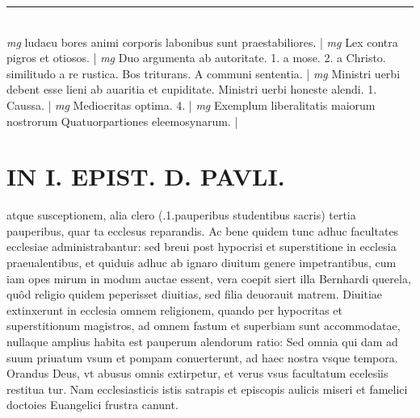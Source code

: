 \documentclass{article}
\begin{document}
\begin{pages}
\vspace{0.5cm}\noindent
\vspace{0.2cm}\rule{1cm}{0.2pt}\\ 
\hspace{0.2cm}\textit{mg}
\footnotesize ludacu bores animi corporis labonibus sunt praestabiliores. 
\normalsize| 
\hspace{0.2cm}\textit{mg}
\footnotesize Lex contra pigros et otiosos. 
\normalsize| 
\hspace{0.2cm}\textit{mg}
\footnotesize Duo argumenta ab autoritate. 1. a mose. 2. a Christo. similitudo a re rustica. Bos triturans. A communi sententia. 
\normalsize| 
\hspace{0.2cm}\textit{mg}
\footnotesize Ministri uerbi debent esse lieni ab auaritia et cupiditate. Ministri uerbi honeste alendi. 1. Caussa. 
\normalsize| 
\hspace{0.2cm}\textit{mg}
\footnotesize Mediocritas optima. 4. 
\normalsize| 
\hspace{0.2cm}\textit{mg}
\footnotesize Exemplum liberalitatis maiorum nostrorum Quatuorpartiones eleemosynarum. 
\normalsize| 
\section*{IN I. EPIST. D. PAVLI. }
\marginpar{[ p.115 ]}\pstart atque susceptionem, alia clero (.1.pauperibus studentibus sacris) tertia pauperibus, quar ta ecclesus reparandis. Ac bene quidem tunc adhuc facultates ecclesiae administrabantur: sed breui post hypocrisi et superstitione in ecclesia praeualentibus, et quiduis adhuc ab ignaro diuitum genere impetrantibus, cum iam opes mirum in modum auctae essent, vera coepit siert illa Bernhardi querela, quôd religio quidem peperisset diuitias, sed filia deuorauit matrem. Diuitiae extinxerunt in ecclesia omnem religionem, quando per hypocritas et superstitionum magistros, ad omnem fastum et superbiam sunt accommodatae, nullaque amplius habita est pauperum alendorum ratio: Sed omnia qui dam ad suum priuatum vsum et pompam conuerterunt, ad haec nostra vsque tempora. Orandus Deus, vt abusus omnis extirpetur, et verus vsus facultatum ecelesiis restitua tur. Nam ecclesiasticis istis satrapis et episcopis aulicis miseri et famelici doctoies Euangelici frustra canunt.  \pend
{}
{}

\end{pages}
\end{document}
